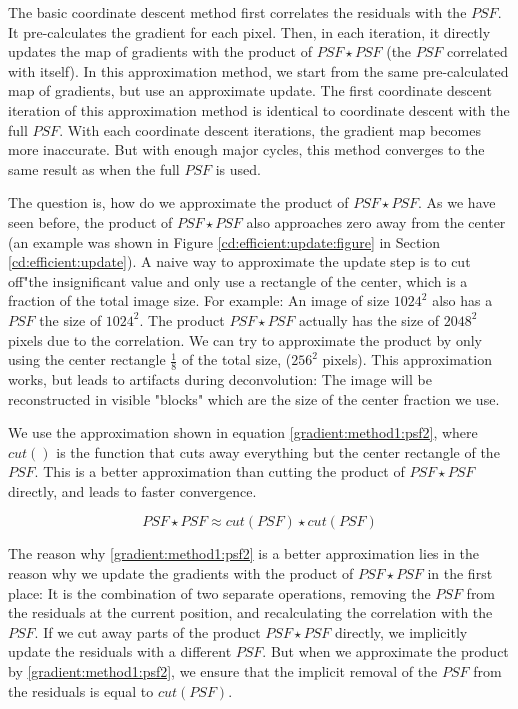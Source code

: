 The basic coordinate descent method first correlates the residuals with the $PSF$. It pre-calculates the gradient for each pixel. Then, in each iteration, it directly updates the map of gradients with the product of $PSF \star PSF$ (the $PSF$ correlated with itself). In this approximation method, we start from the same pre-calculated map of gradients, but use an approximate update. The first coordinate descent iteration of this approximation method is identical to coordinate descent with the full $PSF$. With each coordinate descent iterations, the gradient map becomes more inaccurate. But with enough major cycles, this method converges to the same result as when the full $PSF$ is used.

The question is, how do we approximate the product of $PSF \star PSF$. As we have seen before, the product of $PSF \star PSF$ also approaches zero away from the center (an example was shown in Figure \ref{cd:efficient:update:figure} in Section \ref{cd:efficient:update}). A naive way to approximate the update step is to cut off"the insignificant value and only use a rectangle of the center, which is a fraction of the total image size. For example: An image of size $1024^2$ also has a $PSF$ the size of $1024^2$. The product $PSF \star PSF$ actually has the size of $2048^2$ pixels due to the correlation. We can try to approximate the product by only using the center rectangle $\frac{1}{8}$ of the total size, ($256^2$ pixels). This approximation works, but leads to artifacts during deconvolution: The image will be reconstructed in visible "blocks" which are the size of the center fraction we use. 

We use the approximation shown in equation \eqref{gradient:method1:psf2}, where $cut()$ is the function that cuts away everything but the center rectangle of the $PSF$. This is a better approximation than cutting the product of $PSF \star PSF$ directly, and leads to faster convergence.

\begin{equation}\label{gradient:method1:psf2}
PSF \star PSF \approx cut(PSF) \star cut(PSF)
\end{equation}

The reason why \eqref{gradient:method1:psf2} is a better approximation lies in the reason why we update the gradients with the product of $PSF \star PSF$ in the first place: It is the combination of two separate operations, removing the $PSF$ from the residuals at the current position, and recalculating the correlation with the $PSF$. If we cut away parts of the product $PSF \star PSF$ directly, we implicitly update the residuals with a different $PSF$. But when we approximate the product by \eqref{gradient:method1:psf2}, we ensure that the implicit removal of the $PSF$ from the residuals is equal to $cut(PSF)$.


